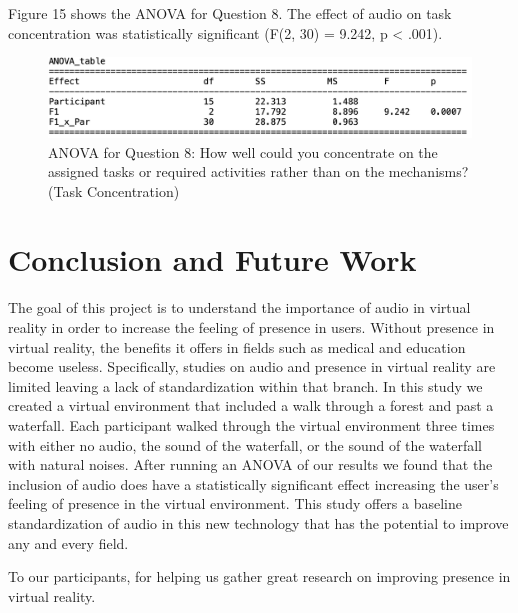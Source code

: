 \documentclass[manuscript,screen,review]{acmart}
\begin{document}
Figure 15 shows the ANOVA for Question 8. The effect of audio on task concentration was statistically significant (F(2, 30) = 9.242, p < .001).

\begin{figure}[ht]
  \centering
  \includegraphics[width=\linewidth]{Q8ANOVA.png}
  \caption{ANOVA for Question 8:  How well could you concentrate on the assigned tasks or required activities rather than on the mechanisms? (Task Concentration)}
\end{figure}



\section{Conclusion and Future Work}
The goal of this project is to understand the importance of audio in virtual reality in order to increase the feeling of presence in users. Without presence in virtual reality, the benefits it offers in fields such as medical and education become useless. Specifically, studies on audio and presence in virtual reality are limited leaving a lack of standardization within that branch.  In this study we created a virtual environment that included a walk through a forest and past a waterfall. Each participant walked through the virtual environment three times with either no audio, the sound of the waterfall, or the sound of the waterfall with natural noises. After running an ANOVA of our results we found that the inclusion of audio does have a statistically significant effect increasing the user’s feeling of presence in the virtual environment. This study offers a baseline standardization of audio in this new technology that has the potential to improve any and every field.



\begin{acks}
To our participants, for helping us gather great research on improving presence in virtual reality.
\end{acks}




\appendix
\end{document}
